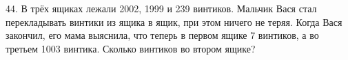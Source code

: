 44. В трёх ящиках лежали 2002, 1999 и 239 винтиков. Мальчик Вася стал перекладывать винтики из ящика в ящик, при этом ничего не теряя. Когда Вася закончил, его мама выяснила, что теперь в первом ящике 7 винтиков, а во третьем 1003 винтика. Сколько винтиков во втором ящике?\\
